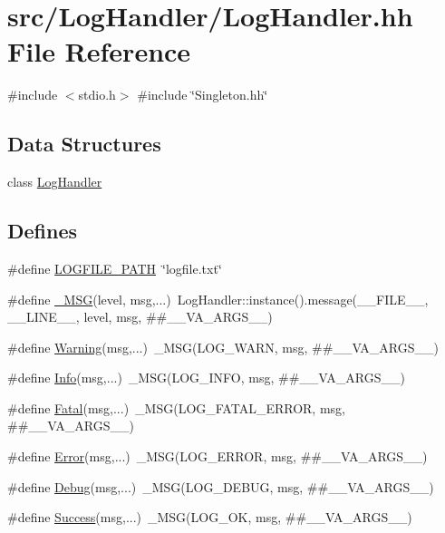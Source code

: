 \hypertarget{LogHandler_8hh}{
\section{src/\-Log\-Handler/\-Log\-Handler.hh \-File \-Reference}
\label{LogHandler_8hh}
}
{\ttfamily \#include $<$stdio.\-h$>$}\*
{\ttfamily \#include \char`\"{}\-Singleton.\-hh\char`\"{}}\*
\subsection*{\-Data \-Structures}
\begin{DoxyCompactItemize}
\item 
class \hyperlink{classLogHandler}{\-Log\-Handler}
\end{DoxyCompactItemize}
\subsection*{\-Defines}
\begin{DoxyCompactItemize}
\item 
\#define \hyperlink{LogHandler_8hh_a456f72fbe9e6baf998125cfec71d6cfd}{\-L\-O\-G\-F\-I\-L\-E\-\_\-\-P\-A\-T\-H}~\char`\"{}logfile.\-txt\char`\"{}
\item 
\#define \hyperlink{LogHandler_8hh_a67237e77d247fb2b13d4bc9a322408bc}{\-\_\-\-M\-S\-G}(level, msg,...)~\-Log\-Handler\-::instance().message(\-\_\-\-\_\-\-F\-I\-L\-E\-\_\-\-\_\-, \-\_\-\-\_\-\-L\-I\-N\-E\-\_\-\-\_\-, level, msg,  \#\#\-\_\-\-\_\-\-V\-A\-\_\-\-A\-R\-G\-S\-\_\-\-\_\-)
\item 
\#define \hyperlink{LogHandler_8hh_a76dc8e0e6250a0fd7124293961ebd111}{\-Warning}(msg,...)~\-\_\-\-M\-S\-G(\-L\-O\-G\-\_\-\-W\-A\-R\-N, msg, \#\#\-\_\-\-\_\-\-V\-A\-\_\-\-A\-R\-G\-S\-\_\-\-\_\-)
\item 
\#define \hyperlink{LogHandler_8hh_ad33695a1806e13f4e48454c9541af99c}{\-Info}(msg,...)~\-\_\-\-M\-S\-G(\-L\-O\-G\-\_\-\-I\-N\-F\-O, msg, \#\#\-\_\-\-\_\-\-V\-A\-\_\-\-A\-R\-G\-S\-\_\-\-\_\-)
\item 
\#define \hyperlink{LogHandler_8hh_aa75b27b8a5cc768d7a9b9636493e8c13}{\-Fatal}(msg,...)~\-\_\-\-M\-S\-G(\-L\-O\-G\-\_\-\-F\-A\-T\-A\-L\-\_\-\-E\-R\-R\-O\-R, msg, \#\#\-\_\-\-\_\-\-V\-A\-\_\-\-A\-R\-G\-S\-\_\-\-\_\-)
\item 
\#define \hyperlink{LogHandler_8hh_a4f164abb1e151a518ca4b881a392c998}{\-Error}(msg,...)~\-\_\-\-M\-S\-G(\-L\-O\-G\-\_\-\-E\-R\-R\-O\-R, msg, \#\#\-\_\-\-\_\-\-V\-A\-\_\-\-A\-R\-G\-S\-\_\-\-\_\-)
\item 
\#define \hyperlink{LogHandler_8hh_aef631d90143b139b77612a011a5a672f}{\-Debug}(msg,...)~\-\_\-\-M\-S\-G(\-L\-O\-G\-\_\-\-D\-E\-B\-U\-G, msg, \#\#\-\_\-\-\_\-\-V\-A\-\_\-\-A\-R\-G\-S\-\_\-\-\_\-)
\item 
\#define \hyperlink{LogHandler_8hh_abb58542afa78bcdb2c6e2ae5d2034127}{\-Success}(msg,...)~\-\_\-\-M\-S\-G(\-L\-O\-G\-\_\-\-O\-K, msg, \#\#\-\_\-\-\_\-\-V\-A\-\_\-\-A\-R\-G\-S\-\_\-\-\_\-)
\end{DoxyCompactItemize}
